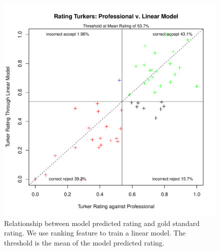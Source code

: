 \documentclass[11pt]{article}
\begin{document}
\begin{figure}[htbp]
  \centering
  \includegraphics[width=\linewidth]{RankingFeature/rrankingrankingfeaturelm.pdf}
  \caption{Relationship between model predicted rating and gold standard rating. We use ranking feature to train a linear model. The threshold is the mean of the model predicted rating.}
    \label{flmrankingrrating1}
\end{figure}
\end{document}
